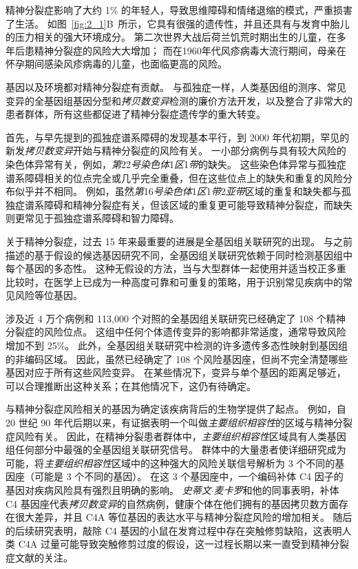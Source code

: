 精神分裂症影响了大约 1\% 的年轻人，导致思维障碍和情绪退缩的模式，严重损害了生活。
如图~\ref{fig:2_1}B~所示，它具有很强的遗传性，并且还具有与发育中胎儿的压力相关的强大环境成分。
第二次世界大战后荷兰饥荒时期出生的儿童，在多年后患精神分裂症的风险大大增加；
而在1960年代风疹病毒大流行期间，母亲在怀孕期间感染风疹病毒的儿童，也面临更高的风险。

基因以及环境都对精神分裂症有贡献。
与孤独症一样，人类基因组的测序、常见变异的全基因组基因分型和\textit{拷贝数变异}检测的廉价方法开发，以及整合了非常大的患者群体，所有这些都促进了精神分裂症遗传学的重大转变。

首先，与早先提到的孤独症谱系障碍的发现基本平行，到 2000 年代初期，罕见的新发\textit{拷贝数变异}开始与精神分裂症的风险有关。
一小部分病例与具有较大风险的染色体异常有关，例如，\textit{第}22\textit{号染色体}1\textit{区}1\textit{带}的缺失。
这些染色体异常与孤独症谱系障碍相关的位点完全或几乎完全重叠，但在这些位点上的缺失和重复的风险分布似乎并不相同。
例如，虽然\textit{第}16\textit{号染色体}1\textit{区}1\textit{带}2\textit{亚带}区域的重复和缺失都与孤独症谱系障碍和精神分裂症有关，但该区域的重复更可能导致精神分裂症，而缺失则更常见于孤独症谱系障碍和智力障碍。


关于精神分裂症，过去 15 年来最重要的进展是全基因组关联研究的出现。
与之前描述的基于假设的候选基因研究不同，全基因组关联研究依赖于同时检测基因组中每个基因的多态性。
这种无假设的方法，当与大型群体一起使用并适当校正多重比较时，在医学上已成为一种高度可靠和可重复的策略，用于识别常见疾病中的常见风险等位基因。


涉及近 4 万个病例和 113,000 个对照的全基因组关联研究已经确定了 108 个精神分裂症的风险位点。 
这组中任何个体遗传变异的影响都非常适度，通常导致风险增加不到 25\%。
此外，全基因组关联研究中检测的许多遗传多态性映射到基因组的非编码区域。
因此，虽然已经确定了 108 个风险基因座，但尚不完全清楚哪些基因对应于所有这些风险变异。
在某些情况下，变异与单个基因的距离足够近，可以合理推断出这种关系；在其他情况下，这仍有待确定。


与精神分裂症风险相关的基因为确定该疾病背后的生物学提供了起点。
例如，自 20 世纪 90 年代后期以来，有证据表明一个叫做\textit{主要组织相容性}的区域与精神分裂症风险有关。
因此，在精神分裂患者群体中，\textit{主要组织相容性}区域具有人类基因组任何部分中最强的全基因组关联研究信号。
群体中的大量患者使详细研究成为可能，将\textit{主要组织相容性}区域中的这种强大的风险关联信号解析为 3 个不同的基因座（可能是 3 个不同的基因）。
在这 3 个基因座中，一个编码补体 C4 因子的基因对疾病风险具有强烈且明确的影响。
\textit{史蒂文$\cdot$麦卡罗}和他的同事表明，补体 C4 基因座代表\textit{拷贝数变异}的自然病例，健康个体在他们拥有的基因拷贝数方面存在很大差异，并且 C4A 等位基因的表达水平与精神分裂症风险的增加相关。
随后的后续研究表明，敲除 C4 基因的小鼠在发育过程中存在突触修剪缺陷，这表明人类 C4A 过量可能导致突触修剪过度的假设，这一过程长期以来一直受到精神分裂症文献的关注。

